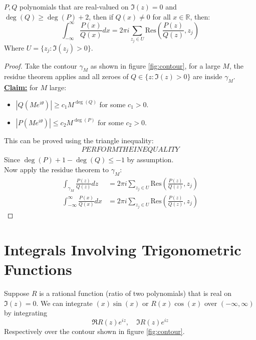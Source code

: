 \begin{proposition}
    $P, Q$ polynomials that are real-valued on $\Im(z) = 0$ and $\deg(Q) \geq \deg(P) + 2$, then if $Q(x) \neq 0$ for all $x \in \mathbb{R}$, then:
    \begin{equation}
        \int_{-\infty}^{\infty} \frac{P(x)}{Q(x)} dx = 2\pi i \sum_{z_j \in U} \text{Res}\left(\frac{P(z)}{Q(z)}, z_j\right)
    \end{equation}
    Where $ U = \{z_j : \Im(z_j) > 0\}$.
    \label{prop:residue}
\end{proposition}

\begin{proof}
    Take the contour $\gamma_M$ as shown in figure \ref{fig:contour}, for a large $M$, the residue theorem applies and all zeroes of $Q \in \{z : \Im(z) > 0\}$ are inside $\gamma_M$. \\
    \underline{\textbf{Claim:}} for $M$ large:
    \begin{itemize}
        \item $|Q(Me^{i\theta})| \geq c_1M^{\deg(Q)}$ for some $c_1 > 0$.
        \item $|P(Me^{i\theta})| \leq c_2M^{\deg(P)}$ for some $c_2 > 0$.
    \end{itemize}
    This can be proved using the triangle inequality:
    \begin{align*}
        PERFORM THE INEQUALITY
    \end{align*}
    Since $\deg(P) + 1 - \deg(Q) \leq -1$ by assumption. \\
    Now apply the residue theorem to $\gamma_M$:
    \begin{align*}
        \int_{\gamma_M} \frac{P(z)}{Q(z)} dz         & = 2\pi i \sum_{z_j \in U} \text{Res}\left(\frac{P(z)}{Q(z)}, z_j\right) \\
        \int_{-\infty}^{\infty} \frac{P(x)}{Q(x)} dx & = 2\pi i \sum_{z_j \in U} \text{Res}\left(\frac{P(z)}{Q(z)}, z_j\right)
    \end{align*}
\end{proof}

\section{Integrals Involving Trigonometric Functions}

\begin{proposition}
    Suppose $R$ is a rational function (ratio of two polynomials) that is real on $\Im(z) = 0$. We can integrate $(x)\sin(x)$ or $R(x)\cos(x)$ over $(-\infty, \infty)$ by integrating
    $$\Re{R(z)e^{iz}}, \quad \Im{R(z)e^{iz}}$$
    Respectively over the contour shown in figure \ref{fig:contour}.
\end{proposition}

